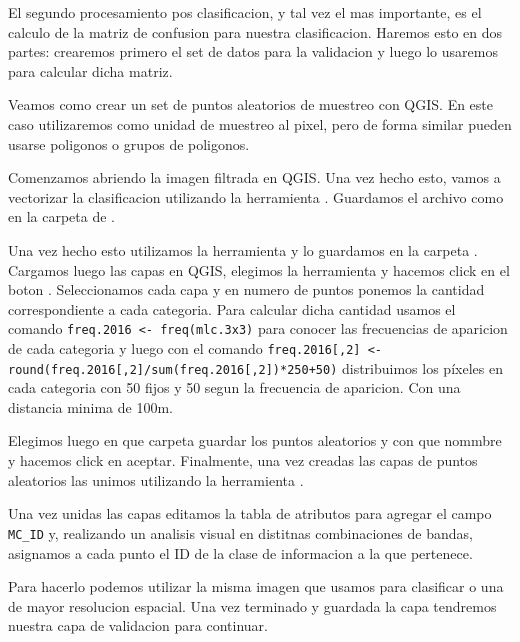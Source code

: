 El segundo procesamiento pos clasificacion, y tal vez el mas importante, es el
calculo de la matriz de confusion para nuestra clasificacion. Haremos esto en
dos partes: crearemos primero el set de datos para la validacion y luego lo usaremos
para calcular dicha matriz.

\begin{exa}
  Veamos como crear un set de puntos aleatorios de muestreo con QGIS. En este
  caso utilizaremos como unidad de muestreo al pixel, pero de forma similar pueden
  usarse poligonos o grupos de poligonos.

  Comenzamos abriendo la imagen filtrada en QGIS. Una vez hecho esto, vamos a
  vectorizar la clasificacion utilizando la herramienta .
  Guardamos el archivo como  en la carpeta de .

  Una vez hecho esto utilizamos la herramienta  y lo
  guardamos en la carpeta . Cargamos luego las capas en
  QGIS, elegimos la herramienta 
  y hacemos click en el boton .  Seleccionamos cada
  capa y en numero de puntos ponemos la cantidad correspondiente a cada categoria.
  Para calcular dicha cantidad usamos el comando \texttt{freq.2016 <- freq(mlc.3x3)}
  para conocer las frecuencias de aparicion de cada categoria y luego con el comando
  \texttt{freq.2016[,2] <- round(freq.2016[,2]/sum(freq.2016[,2])*250+50)} distribuimos
  los p\'ixeles en cada categoria con 50 fijos y 50 segun la frecuencia de aparicion.
  Con una distancia minima de 100m.

  Elegimos luego en que carpeta guardar los puntos aleatorios y con que nommbre y hacemos
  click en aceptar. Finalmente, una vez creadas las capas de puntos aleatorios
  las unimos utilizando la herramienta .

  Una vez unidas las capas editamos la tabla de atributos para agregar el campo
  \verb|MC_ID| y, realizando un analisis visual en distitnas combinaciones de bandas,
  asignamos a cada punto el ID de la clase de informacion a la que pertenece.

  Para hacerlo podemos utilizar la misma imagen que usamos para clasificar o una
  de mayor resolucion espacial. Una vez terminado y guardada la capa tendremos nuestra capa
  de validacion para continuar.

\end{exa}

